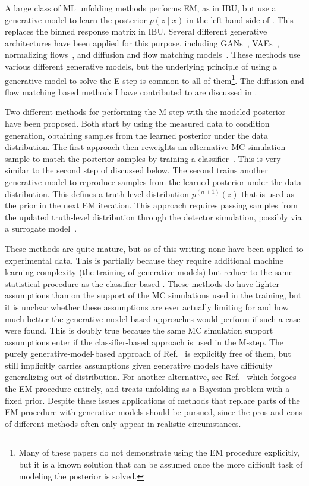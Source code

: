 A large class of ML unfolding methods performs EM, as in IBU, but use a generative model to learn the posterior $p(z \mid x)$ in the left hand side of .
This replaces the binned response matrix in IBU.
Several different generative architectures have been applied for this purpose, including GANs~\cite{Datta:2018mwd,Bellagente:2019uyp}, VAEs~\cite{Howard:2021pos}, normalizing flows~\cite{Bellagente:2020piv,Diefenbacher:2023wec, Butter:2024vbx}, and diffusion and flow matching models~\cite{Butter:2025mek}.
These methods use various different generative models, but the underlying principle of using a generative model to solve the E-step is common to all of them\footnote{Many of these papers do not demonstrate using the EM procedure explicitly, but it is a known solution that can be assumed once the more difficult task of modeling the posterior is solved.}.
The diffusion and flow matching based methods I have contributed to are discussed in .

Two different methods for performing the M-step with the modeled posterior have been proposed.
Both start by using the measured data to condition generation, obtaining samples from the learned posterior under the data distribution.
The first approach then reweights an alternative MC simulation sample to match the posterior samples by training a classifier~\cite{Backes:2022sph}.
This is very similar to the second step of \Omnifold discussed below.
The second trains another generative model to reproduce samples from the learned posterior under the data distribution.
This defines a truth-level distribution $p^{(n+1)}(z)$ that is used as the prior in the next EM iteration.
This approach requires passing samples from the updated truth-level distribution through the detector simulation, possibly via a surrogate model~\cite{Butter:2025mek}.

These methods are quite mature, but as of this writing none have been applied to experimental data.
This is partially because they require additional machine learning complexity (the training of generative models) but reduce to the same statistical procedure as the classifier-based \Omnifold.
These methods do have lighter assumptions than \Omnifold on the support of the MC simulations used in the training, but it is unclear whether these assumptions are ever actually limiting for \Omnifold and how much better the generative-model-based approaches would perform if such a case were found.
This is doubly true because the same MC simulation support assumptions enter if the classifier-based approach is used in the M-step.
The purely generative-model-based approach of Ref.~\cite{Butter:2025mek} is explicitly free of them, but still implicitly carries assumptions given generative models have difficulty generalizing out of distribution.
For another alternative, see Ref.~\cite{Acosta:2025shf} which forgoes the EM procedure entirely, and treats unfolding as a Bayesian problem with a fixed prior.
Despite these issues applications of methods that replace parts of the EM procedure with generative models should be pursued, since the pros and cons of different methods often only appear in realistic circumstances.

